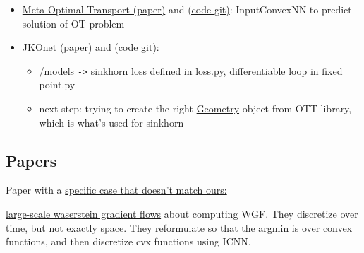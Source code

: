 \begin{itemize}
	\item \href{https://arxiv.org/pdf/2206.05262.pdf}{Meta Optimal Transport (paper)} and \href{https://github.com/facebookresearch/meta-ot}{(code git)}: InputConvexNN to predict solution of OT problem
	\item \href{https://arxiv.org/pdf/2106.06345.pdf}{JKOnet (paper)} and \href{https://github.com/bunnech/jkonet}{(code git)}:
		\begin{itemize}
			\item \href{https://github.com/bunnech/jkonet/tree/main/jkonet/models}{/models} \verb|->| sinkhorn loss defined in loss.py, differentiable loop in fixed point.py
			\item next step: trying to create the right \href{https://ott-jax.readthedocs.io/en/latest/_autosummary/ott.geometry.geometry.Geometry.html#ott.geometry.geometry.Geometry}{Geometry} object from OTT library, which is what's used for sinkhorn
		\end{itemize}
\end{itemize}



\subsection{Papers}


Paper with a \href{https://arxiv.org/pdf/1512.02783.pdf}{specific case that doesn't match ours:} 

\href{https://arxiv.org/pdf/2106.00736.pdf}{large-scale waserstein gradient flows} about computing WGF. They discretize over time, but not exactly space. They reformulate so that the argmin is over convex functions, and then discretize cvx functions using ICNN.

